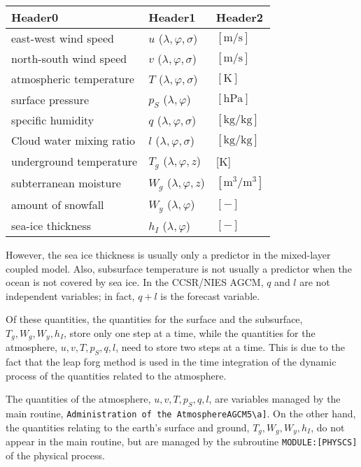 \setlength\LTleft{0pt}\setlength\LTright{0pt}\begin{longtable}[]{@{}lll@{}}
\toprule\relax
Header0 & Header1 & Header2 \\
\midrule\relax
\endhead
east-west wind speed & \(u\) (\(\lambda,\varphi,\sigma\)) &
\(\mathrm{[m/s]}\) \\
north-south wind speed & \(v\) (\(\lambda,\varphi,\sigma\)) &
\(\mathrm{[m/s]}\) \\
atmospheric temperature & \(T\) (\(\lambda,\varphi,\sigma\)) &
\(\mathrm{[K]}\) \\
surface pressure & \(p_S\) (\(\lambda,\varphi\)) & \(\mathrm{[hPa]}\) \\
specific humidity & \(q\) (\(\lambda,\varphi,\sigma\)) &
\(\mathrm{[kg/kg]}\) \\
Cloud water mixing ratio & \(l\) (\(\lambda,\varphi,\sigma\)) &
\(\mathrm{[kg/kg]}\) \\
underground temperature & \(T_g\) (\(\lambda,\varphi,z\)) & {[}K{]} \\
subterranean moisture & \(W_g\) (\(\lambda,\varphi,z\)) &
\(\mathrm{[m^3/m^3]}\) \\
amount of snowfall & \(W_y\) (\(\lambda,\varphi\)) & \(\mathrm{[-]}\) \\
sea-ice thickness & \(h_I\) (\(\lambda,\varphi\)) & \(\mathrm{[-]}\) \\
\bottomrule
\end{longtable}

However, the sea ice thickness is usually only a predictor in the
mixed-layer coupled model. Also, subsurface temperature is not usually a
predictor when the ocean is not covered by sea ice. In the CCSR/NIES
AGCM, \(q\) and \(l\) are not independent variables; in fact, \(q+l\) is
the forecast variable.

Of these quantities, the quantities for the surface and the subsurface,
\(T_g, W_g, W_y, h_I\), store only one step at a time, while the
quantities for the atmosphere, \(u, v, T, p_S, q, l\), need to store two
steps at a time. This is due to the fact that the leap forg method is
used in the time integration of the dynamic process of the quantities
related to the atmosphere.

The quantities of the atmosphere, \(u, v, T, p_S, q, l\), are variables
managed by the main routine,
\texttt{Administration\ of\ the\ Atmosphere\textquotesingle{}{[}AGCM5\textbackslash{}a{]}}.
On the other hand, the quantities relating to the earth's surface and
ground, \(T_g, W_g, W_y, h_I\), do not appear in the main routine, but
are managed by the subroutine \texttt{MODULE:{[}PHYSCS{]}} of the
physical process.

